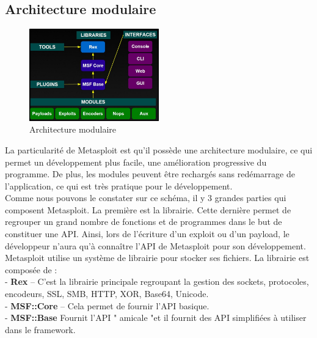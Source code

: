 \subsection{Architecture modulaire}
\begin{figure}[htp!]
  \centering
  \setlength\figureheight{7cm}
  \setlength\figurewidth{9cm}
  \includegraphics[width=0.5\textwidth]{oui/Ancien/imangeancien/Metasploit_Architecture.jpg}
  \caption{Architecture modulaire}
  \label{fig:courbe-tikz}
\end{figure}

La particularité de Metasploit est qu’il possède une architecture modulaire, ce qui permet un développement plus facile, une amélioration progressive du programme. De plus, les modules peuvent être rechargés sans redémarrage de l’application, ce qui est très pratique pour le développement.\\
Comme nous pouvons le constater sur ce schéma, il y 3 grandes parties qui composent Metasploit. La première est la librairie. Cette dernière permet de regrouper un grand nombre de fonctions et de programmes dans le but de constituer une API. Ainsi, lors de l’écriture d’un exploit ou d’un payload, le développeur n’aura qu'à connaître l’API de Metasploit pour son développement.\\
\noindent Metasploit utilise un système de librairie pour stocker ses fichiers.
\noindent La librairie est composée de :\\
- \textbf{Rex} – C’est la librairie principale regroupant la gestion des sockets, protocoles, encodeurs, SSL, SMB, HTTP, XOR, Base64, Unicode.\\
- \textbf{MSF::Core} – Cela permet de fournir l’API basique.\\
- \textbf{MSF::Base} Fournit l'API " amicale "et il fournit des API simplifiées à utiliser dans le framework.\\

